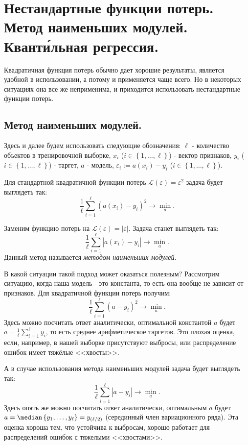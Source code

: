 \section*{Нестандартные функции потерь. Метод наименьших модулей. Квант\'{и}льная регрессия.}

Квадратичная функция потерь обычно дает хорошие результаты, является удобной в использовании, а потому и применяется чаще всего. Но в некоторых ситуациях она все же неприменима, и приходится использовать нестандартные функции потерь.

\subsection*{Метод наименьших модулей.}

Здесь и далее будем использовать следующие обозначения: $\ell$ - количество объектов в тренировочной выборке, $x_i$ ($i \in \left\{1, \dotsc, \ell \right\}$) - вектор признаков, $y_i$ ($i \in \left\{1, \dotsc, \ell \right\}$) - таргет, $a$ - модель, $\varepsilon_i := a(x_i) - y_i$ ($i \in \left\{1, \dotsc, \ell \right\}$).

Для стандартной квадратичной функции потерь $\mathscr{L}(\varepsilon) = \varepsilon^2$ задача будет выглядеть так:
$$\frac{1}{\ell}\sum\limits_{i=1}^\ell\left(a(x_i) - y_i\right)^2 \longrightarrow \min\limits_{a}.$$

Заменим функцию потерь на $\mathscr{L}(\varepsilon) = |\varepsilon|$.
Задача станет выглядеть так:
$$\frac{1}{\ell}\sum\limits_{i=1}^\ell\left|a(x_i) - y_i\right| \longrightarrow \min\limits_{a}.$$
Данный метод называется \textit{методом наименьших модулей}.

В какой ситуации такой подход может оказаться полезным? Рассмотрим ситуацию,  когда наша модель - это константа, то есть она вообще не зависит от признаков. Для квадратичной функции потерь получим:
$$\frac{1}{\ell}\sum\limits_{i=1}^\ell\left(a - y_i\right)^2 \longrightarrow \min\limits_{a}.$$
Здесь можно посчитать ответ аналитически, оптимальной константой $a$ будет $a = \frac{1}{\ell}\sum\limits_{i=1}^\ell y_i$, то есть среднее арифметическое таргетов. Это плохая оценка, если, например, в нашей выборке присутствуют выбросы, или распределение ошибок имеет тяжёлые <<хвосты>>.

А в случае использования метода наименьших модулей задача будет выглядеть так:
$$\frac{1}{\ell}\sum\limits_{i=1}^\ell\left|a - y_i\right| \longrightarrow \min\limits_{a}.$$
Здесь опять же можно посчитать ответ аналитически, оптимальным $a$ будет $a = \median\left\{ y_1, \dotsc, y_\ell \right\} = y_{(\ell / 2)}$ (серединный член вариационного ряда). Эта оценка хороша тем, что устойчива к выбросам, хорошо работает для распределений ошибок с тяжелыми <<хвостами>>.

